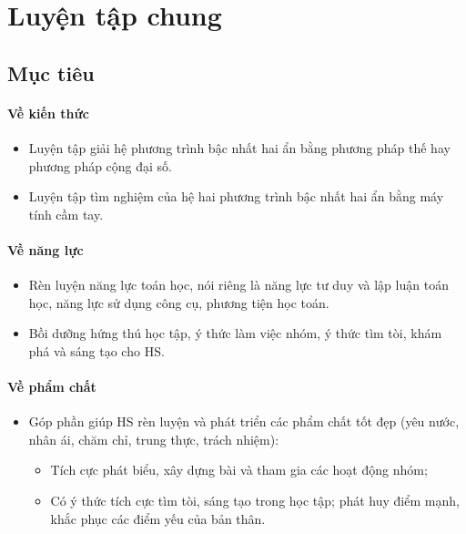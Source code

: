 \section{Luyện tập chung}

\subsection{Mục tiêu}

\paragraph{Về kiến thức}

\begin{itemize}
	\item Luyện tập giải hệ phương trình bậc nhất hai ẩn bằng phương pháp thế hay phương pháp cộng đại số.
	\item Luyện tập tìm nghiệm của hệ hai phương trình bậc nhất hai ẩn bằng máy tính cầm tay.
\end{itemize}

\paragraph{Về năng lực}

\begin{itemize}
	\item Rèn luyện năng lực toán học, nói riêng là năng lực tư duy và lập luận toán học, năng lực sử dụng công cụ, phương tiện học toán.
	\item Bồi dưỡng hứng thú học tập, ý thức làm việc nhóm, ý thức tìm tòi, khám phá và sáng tạo cho HS. 
\end{itemize}

\paragraph{Về phẩm chất}

\begin{itemize}
	\item Góp phần giúp HS rèn luyện và phát triển các phẩm chất tốt đẹp (yêu nước, nhân ái, chăm chỉ, trung thực, trách nhiệm):
	\begin{itemize}
		\item Tích cực phát biểu, xây dựng bài và tham gia các hoạt động nhóm;
		\item Có ý thức tích cực tìm tòi, sáng tạo trong học tập; phát huy điểm mạnh, khắc phục các điểm yếu của bản thân. 
	\end{itemize}
\end{itemize}

